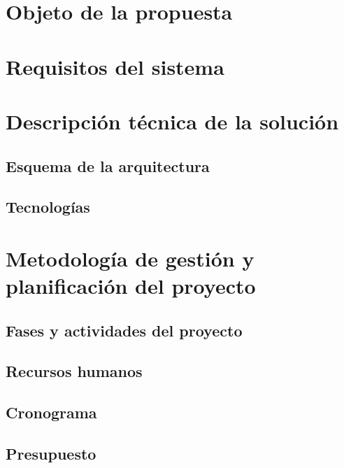 \documentclass[11pt,spanish]{article}
\begin{document}
\section{Objeto de la propuesta}



\section{Requisitos del sistema}



\section{Descripción técnica de la solución}


\subsection{Esquema de la arquitectura}


\subsection{Tecnologías}



\section{Metodología de gestión y planificación del proyecto}


\subsection{Fases y actividades del proyecto}


\subsection{Recursos humanos}


\subsection{Cronograma}


\subsection{Presupuesto}

\end{document}
